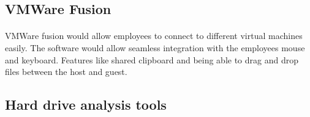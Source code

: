\documentclass{article}
\begin{document}
\subsection{VMWare Fusion} 
\paragraph{}
VMWare fusion would allow employees to connect to different virtual machines easily.
The software would allow seamless integration with the employees mouse and keyboard. 
Features like shared clipboard and being able to drag and drop files between the host and guest.
\subsection{Hard drive analysis tools}
\end{document}
